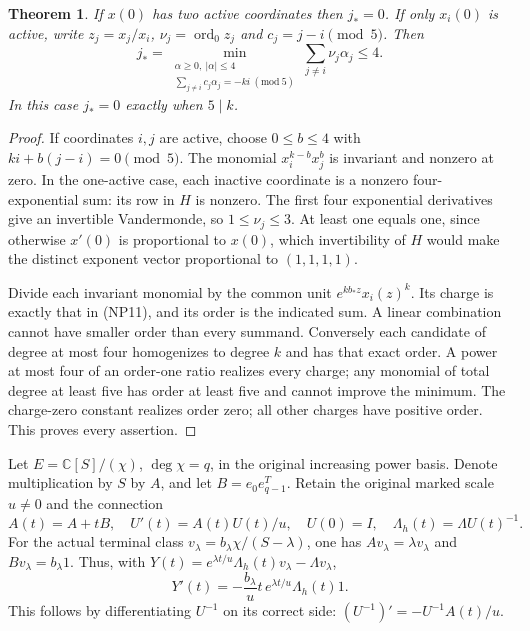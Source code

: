 \documentclass[11pt]{article}
\newtheorem{theorem}{Theorem}
\newcommand{\C}{\mathbb C}
\begin{document}
\begin{theorem}
If $x(0)$ has two active coordinates then $j_*=0$. If only $x_i(0)$
is active, write $z_j=x_j/x_i$, $\nu_j=\operatorname{ord}_0z_j$
and $c_j=j-i\pmod5$. Then
\[
 j_* =\min_{\substack{\alpha\ge0,\ |\alpha|\le4\\
             \sum_{j\ne i}c_j\alpha_j=-ki\ (\mathrm{mod}\ 5)}}
                  \sum_{j\ne i}\nu_j\alpha_j\le4. \tag{NP11}
\]
In this case $j_*=0$ exactly when $5\mid k$.
\end{theorem}
\begin{proof}
If coordinates $i,j$ are active, choose $0\le b\le4$ with
$ki+b(j-i)=0\pmod5$. The monomial $x_i^{k-b}x_j^b$ is invariant
and nonzero at zero. In the one-active case, each inactive coordinate
is a nonzero four-exponential sum: its row in $H$ is nonzero. The
first four exponential derivatives give an invertible Vandermonde,
so $1\le\nu_j\le3$. At least one equals one, since otherwise
$x'(0)$ is proportional to $x(0)$, which invertibility of $H$ would
make the distinct exponent vector proportional to $(1,1,1,1)$.

Divide each invariant monomial by the common unit
$e^{kb_*z}x_i(z)^k$. Its charge is exactly that in (NP11), and its
order is the indicated sum. A linear combination cannot have smaller
order than every summand. Conversely each candidate of degree at most
four homogenizes to degree $k$ and has that exact order. A power at
most four of an order-one ratio realizes every charge; any monomial
of total degree at least five has order at least five and cannot
improve the minimum. The charge-zero constant realizes order zero;
all other charges have positive order. This proves every assertion.
\end{proof}

Let $E=\C[S]/(\chi)$, $\deg\chi=q$, in the original increasing
power basis. Denote multiplication by $S$ by $A$, and let
$B=e_0e_{q-1}^T$. Retain the original marked scale $u\ne0$ and
the connection
\[
 A(t)=A+tB,\quad U'(t)=A(t)U(t)/u,\quad U(0)=I,
 \quad\Lambda_h(t)=\Lambda U(t)^{-1}. \tag{NP12}
\]
For the actual terminal class $v_\lambda=b_\lambda\chi/(S-\lambda)$,
one has $Av_\lambda=\lambda v_\lambda$ and $Bv_\lambda=b_\lambda1$.
Thus, with $Y(t)=e^{\lambda t/u}\Lambda_h(t)v_\lambda-\Lambda v_\lambda$,
\[
 Y'(t)=-\frac{b_\lambda}{u}t\,e^{\lambda t/u}\Lambda_h(t)1.
 \tag{NP13}
\]
This follows by differentiating $U^{-1}$ on its correct side:
$(U^{-1})'=-U^{-1}A(t)/u$.
\end{document}
